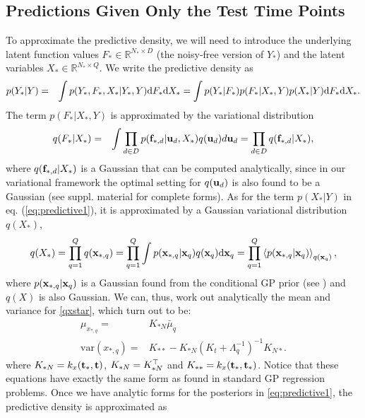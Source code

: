 \documentclass{article} %
\begin{document}
\subsection{Predictions Given Only the Test Time Points \label{unobservedData}}
To approximate the predictive density, we will need to introduce the underlying latent function values $F_* \in \mathbb{R}^{N_* \times D}$ (the noisy-free version of $Y_*$) and the latent variables $X_* \in \mathbb{R}^{N_* \times Q}$. We  write the predictive density as
\begin{eqnarray}
p(Y_* | Y) & = & \int p(Y_*, F_*, X_*| Y_*, Y) \text{d}  F_* \text{d}  X_* =  \int p(Y_* | F_*)  p(F_*|X_*, Y) p(X_*|  Y) \text{d}  F_* \text{d}  X_* .
\label{eq:predictive1}
\end{eqnarray}
The term $p(F_* |X_*, Y)$ is approximated by the variational distribution
\begin{eqnarray}
q(F_*|X_*) & = & \int \prod_{d \in D} p(\mathbf{f}_{*,d} | \mathbf{u}_d, X_*)  q(\mathbf{u}_d) d \mathbf{u}_d 
	    = \prod_{d \in D} q(\mathbf{f}_{*,d} | X_*)  ,
\end{eqnarray}
where $q(\mathbf{f}_{*,d} | X_*)$ is a Gaussian that can be computed analytically,
since in our variational framework the optimal setting for $q(\mathbf{u}_d)$ is also found to be a Gaussian (see suppl. material for complete forms).
%
As for the term $p(X_*| Y)$ in eq. (\ref{eq:predictive1}), it is approximated by
a Gaussian variational distribution $q(X_*)$,
%
\begin{align}
 q(X_*) = \prod_{q=1}^Q q(\mathbf{x}_{*,q}) = 
\prod_{q=1}^Q   \int  p(\mathbf{x}_{*,q} | \mathbf{x}_q) q(\mathbf{x}_q) \text{d} \mathbf{x}_q = \prod_{q=1}^Q \left\langle  p(\mathbf{x}_{*,q} | \mathbf{x}_q) \right\rangle_{q(\mathbf{x}_q)} ,\label{qxstar}
\end{align}
%
where $p(\mathbf{x}_{*,q} | \mathbf{x}_q)$ is a Gaussian found from the conditional GP prior
(see \cite{rasmussen-williams}) and $q(X)$ is also Gaussian. We can, thus, work out analytically the mean and variance 
for \eqref{qxstar}, which turn out to be:
\begin{align}
 \mu_{x_{*,q}} = {}& K_{*N} \bar{\mu}_q \\
  \text{var}(x_{*,q}) = {}& K_{**} - K_{*N} (K_t + \Lambda_q^{-1})^{-1} K_{N*}.
\end{align}
where $K_{*N} = k_x(\mathbf{t}_*, \mathbf{t})$, $K_{*N} = K_{*N}^{\top}$ and $K_{**} = k_x(\mathbf{t}_*, \mathbf{t}_*)$. Notice that these equations have
exactly the same form as found in standard GP regression problems.
%
Once we have analytic forms for the posteriors in \eqref{eq:predictive1}, the predictive density is approximated as
\end{document}
